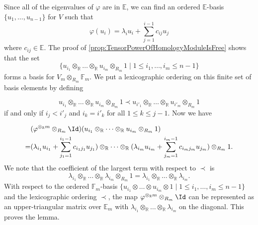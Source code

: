 \documentclass{amsart}
\makeatletter
\renewenvironment{proof}[1][\proofname]{%
   \par\pushQED{\qed}\normalfont%
   \topsep6\p@\@plus6\p@\relax
   \trivlist\item[\hskip\labelsep\bfseries#1\@addpunct{.}]%
   \ignorespaces
}{%
   \popQED\endtrivlist\@endpefalse
}
\makeatother
\begin{document}
\begin{proof}
    Since all of the eigenvalues of $\varphi$ are in $\mathbb{E}$, we can find an ordered $\mathbb{E}$-basis $\{u_1,\dots,u_{n-1}\}$ for $V$ such that
    \[
    \varphi(u_i) = \lambda_i u_i + \sum_{j=1}^{i-1} c_{ij} u_j
     \]
     where $c_{ij} \in \mathbb{E}$. The proof of \cref{prop:TensorPowerOfHomologyModuleIsFree} shows that the set 
     \[\{ u_{i_1} \otimes_{\mathbb{R}} \dots \otimes_{\mathbb{R}} u_{i_m} \otimes_{R_m} 1\mid 1 \leq i_1,\dots,i_m \leq n-1\}\] 
     forms a basis for $V_m\otimes_{R_m} \mathbb{F}_m$. We put a lexicographic ordering on this finite set of basis elements by defining 
     
     \[
     u_{i_1} \otimes_{\mathbb{R}} \dots \otimes_{\mathbb{R}} u_{i_m}\otimes_{R_m} 1 \prec u_{i'_1} \otimes_{\mathbb{R}} \dots \otimes_{\mathbb{R}} u_{i'_m}\otimes_{R_m} 1
     \]
     if and only if $i_j < i'_j$ and $i_k = i'_k$ for all $1\leq k \leq j-1$. Now we have
     
     \begin{align*}
     &(\varphi^{\otimes_\mathbb{R} m} \otimes_{R_m} \Id) (u_{i_1} \otimes_{\mathbb{R}} \dots \otimes_{\mathbb{R}} u_{i_{m}}\otimes_{R_m} 1) \\
     = &(\lambda_{i_1} u_{i_1} + \sum_{j_1=1}^{i_1-1} c_{i_1j_1} u_{j_1}) \otimes_{\mathbb{R}} \dots \otimes_{\mathbb{R}} (\lambda_{i_m} u_{i_m} + \sum_{j_m=1}^{i_m-1} c_{i_mj_m} u_{j_m})\otimes_{R_m} 1.  \\    
     \end{align*}
    \noindent
    We note that the coefficient of the largest term with respect to $\prec$ is 
    \[
    \lambda_{i_1} \otimes_{\mathbb{R}} \dots \otimes_{\mathbb{R}}\lambda_{i_m}\otimes_{R_m} 1 = \lambda_{i_1} \otimes_{\mathbb{R}} \dots \otimes_{\mathbb{R}}\lambda_{i_m}.
    \]
    With respect to the ordered $\mathbb{F}_m$-basis $\{ u_{i_1} \otimes \dots \otimes u_{i_m} \otimes 1 \mid 1 \leq i_1,\dots,i_m \leq n-1\}$ and the lexicographic ordering $\prec$, the map $\varphi^{\otimes_\mathbb{R} m} \otimes_{R_m} \Id$ can be represented as an upper-triangular matrix over $\mathbb{E}_m$ with $\lambda_{i_1} \otimes_{\mathbb{R}} \dots \otimes_{\mathbb{R}}\lambda_{i_m}$ on the diagonal. This proves the lemma.
\end{proof}
\end{document}
